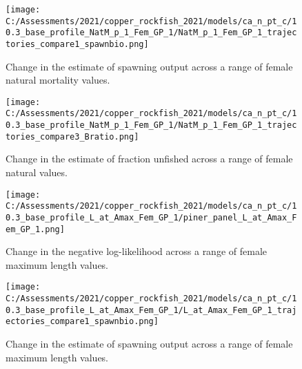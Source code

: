 \documentclass[11pt,
  english,
  a4paper,
]{article}
\begin{document}
\tagmcend\tagstructend


\begin{figure}
\centering
\texttt{[image: C:/Assessments/2021/copper\_rockfish\_2021/models/ca\_n\_pt\_c/10.3\_base\_profile\_NatM\_p\_1\_Fem\_GP\_1/NatM\_p\_1\_Fem\_GP\_1\_trajectories\_compare1\_spawnbio.png]}
\caption{Change in the estimate of spawning output across a range of female natural mortality values.\label{fig:m-ssb}}
\end{figure}

\tagmcend\tagstructend


\begin{figure}
\centering
\texttt{[image: C:/Assessments/2021/copper\_rockfish\_2021/models/ca\_n\_pt\_c/10.3\_base\_profile\_NatM\_p\_1\_Fem\_GP\_1/NatM\_p\_1\_Fem\_GP\_1\_trajectories\_compare3\_Bratio.png]}
\caption{Change in the estimate of fraction unfished across a range of female natural values.\label{fig:m-depl}}
\end{figure}

\tagmcend\tagstructend


\begin{figure}
\centering
\texttt{[image: C:/Assessments/2021/copper\_rockfish\_2021/models/ca\_n\_pt\_c/10.3\_base\_profile\_L\_at\_Amax\_Fem\_GP\_1/piner\_panel\_L\_at\_Amax\_Fem\_GP\_1.png]}
\caption{Change in the negative log-likelihood across a range of female maximum length values.\label{fig:linf-profile}}
\end{figure}

\tagmcend\tagstructend


\begin{figure}
\centering
\texttt{[image: C:/Assessments/2021/copper\_rockfish\_2021/models/ca\_n\_pt\_c/10.3\_base\_profile\_L\_at\_Amax\_Fem\_GP\_1/L\_at\_Amax\_Fem\_GP\_1\_trajectories\_compare1\_spawnbio.png]}
\caption{Change in the estimate of spawning output across a range of female maximum length values.\label{fig:linf-ssb}}
\end{figure}

\tagmcend\tagstructend
\end{document}
